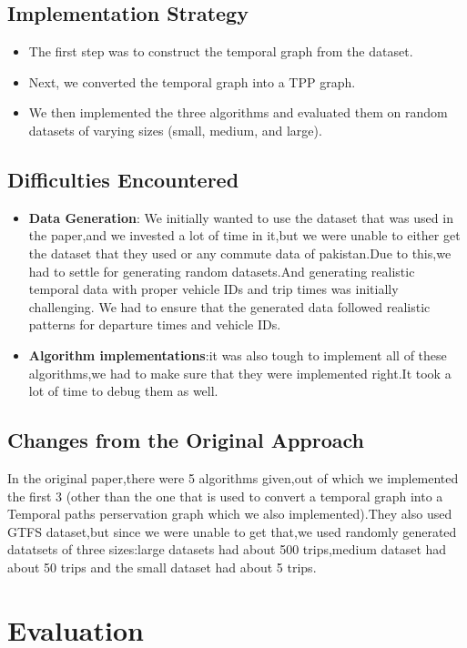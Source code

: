 \documentclass[a4paper,12pt]{article}
\begin{document}
\subsection{Implementation Strategy}
\begin{itemize}
    \item The first step was to construct the temporal graph from the dataset.
    \item Next, we converted the temporal graph into a TPP graph.
    \item We then implemented the three algorithms and evaluated them on random datasets of varying sizes (small, medium, and large).
\end{itemize}

\subsection{Difficulties Encountered}
\begin{itemize}
    \item \textbf{Data Generation}:  We initially wanted to use the dataset that was used in the paper,and we invested a lot of time in it,but we were unable to either get the dataset that they used or any commute data of pakistan.Due to this,we had to settle for generating random datasets.And generating realistic temporal data with proper vehicle IDs and trip times was initially challenging. We had to ensure that the generated data followed realistic patterns for departure times and vehicle IDs.
    \item \textbf{Algorithm implementations}:it was also tough to implement all of these algorithms,we had to make sure that they were implemented right.It took a lot of time to debug them as well. 
\end{itemize}

\subsection{Changes from the Original Approach}
In the original paper,there were 5 algorithms given,out of which we implemented the first 3 (other than the one that is used to convert a temporal graph into a Temporal paths perservation graph which we also implemented).They also used GTFS dataset,but since we were unable to get that,we used randomly generated datatsets of three sizes:large datasets had about 500 trips,medium dataset had about 50 trips and the small dataset had about 5 trips.

\section{Evaluation}
\end{document}
